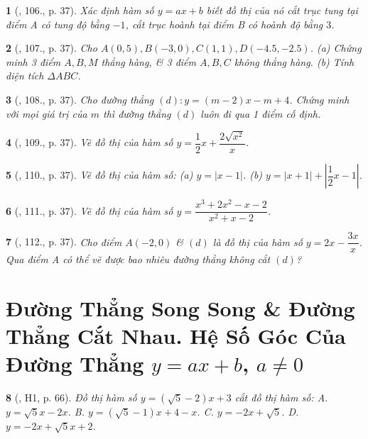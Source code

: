 \documentclass{article}
\newtheorem{baitoan}{}
\begin{document}
\begin{baitoan}[\cite{Tuyen_Toan_9_old}, 106., p. 37]
	Xác định hàm số $y = ax + b$ biết đồ thị của nó cắt trục tung tại điểm A có tung độ bằng $-1$, cắt trục hoành tại điểm B có hoành độ bằng $3$.
\end{baitoan}

\begin{baitoan}[\cite{Tuyen_Toan_9_old}, 107., p. 37]
	Cho $A(0,5),B(-3,0),C(1,1),D(-4.5,-2.5)$. (a) Chứng minh 3 điểm $A,B,M$ thẳng hàng, \& 3 điểm $A,B,C$ không thẳng hàng. (b) Tính diện tích $\Delta ABC$.
\end{baitoan}

\begin{baitoan}[\cite{Tuyen_Toan_9_old}, 108., p. 37]
	Cho đường thẳng $(d):y = (m - 2)x - m + 4$. Chứng minh với mọi giá trị của $m$ thì đường thẳng $(d)$ luôn đi qua 1 điểm cố định.
\end{baitoan}

\begin{baitoan}[\cite{Tuyen_Toan_9_old}, 109., p. 37]
	Vẽ đồ thị của hàm số $y = \dfrac{1}{2}x + \dfrac{2\sqrt{x^2}}{x}$.
\end{baitoan}

\begin{baitoan}[\cite{Tuyen_Toan_9_old}, 110., p. 37]
	Vẽ đồ thị của hàm số: (a) $y = |x - 1|$. (b) $y = |x + 1| + \left|\dfrac{1}{2}x - 1\right|$.
\end{baitoan}

\begin{baitoan}[\cite{Tuyen_Toan_9_old}, 111., p. 37]
	Vẽ đồ thị của hàm số $y = \dfrac{x^3 + 2x^2 - x - 2}{x^2 + x - 2}$.
\end{baitoan}

\begin{baitoan}[\cite{Tuyen_Toan_9_old}, 112., p. 37]
	Cho điểm $A(-2,0)$ \& $(d)$ là đồ thị của hàm số $y = 2x - \dfrac{3x}{x}$. Qua điểm A có thể vẽ được bao nhiêu đường thẳng không cắt $(d)$?
\end{baitoan}


\section{Đường Thẳng Song Song \& Đường Thẳng Cắt Nhau. Hệ Số Góc Của Đường Thẳng $y = ax + b$, $a\ne0$}

\begin{baitoan}[\cite{Binh_boi_duong_Toan_9_tap_1}, H1, p. 66]
	Đồ thị hàm số $y = (\sqrt{5} - 2)x + 3$ cắt đồ thị hàm số: {\sf A.} $y =  \sqrt{5}x - 2x$. {\sf B.} $y = (\sqrt{5} - 1)x + 4 - x$. {\sf C.} $y = -2x + \sqrt{5}$. {\sf D.} $y = -2x + \sqrt{5}x + 2$.
\end{baitoan}
\end{document}
